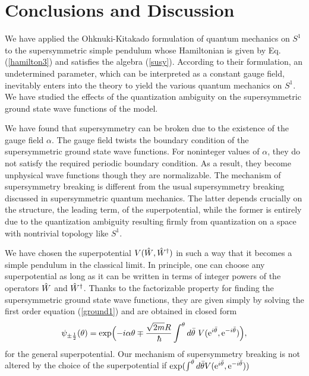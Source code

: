 \documentclass[a4paper,12pt]{article}
\begin{document}
{\section{Conclusions and Discussion}
We have applied the Ohknuki-Kitakado formulation of quantum 
mechanics on $S^1$ to the supersymmetric 
simple pendulum whose Hamiltonian is given by Eq. (\ref{hamilton3}) and 
satisfies the algebra (\ref{susy}). 
According to their formulation, an undetermined parameter, which can be 
interpreted as a constant gauge field, inevitably
enters into the theory to yield the various quantum mechanics on $S^1$.  
We have studied the effects of the quantization ambiguity on the 
supersymmetric ground state wave functions of the model.
\par
We have found that supersymmetry can be broken due to the 
existence of the gauge field $\alpha$. The gauge field twists 
the boundary condition
of the supersymmetric ground state wave functions. 
For noninteger values of $\alpha$, they 
do not satisfy the required periodic boundary condition.
As a result, they become unphysical wave functions though they are 
normalizable. The mechanism of supersymmetry breaking 
is different from the usual supersymmetry breaking
discussed in supersymmetric quantum mechanics. 
The latter depends crucially on the structure, the leading term, of 
the superpotential, while the former is entirely due to the quantization 
ambiguity resulting firmly from 
quantization on a space with nontrivial topology like $S^1$. 
\par
We have chosen the superpotential $V(\hat W,{\hat W}^{\dagger})$
in such a way that it becomes a simple pendulum in the classical limit.
In principle, one can choose any superpotential as long as it can be written 
in terms of integer powers of the operators $\hat W$ and ${\hat W}^{\dagger}$. 
Thanks to the factorizable property for finding  
the supersymmetric ground state wave functions,
they are given simply by solving the first order equation (\ref{ground1})
and are obtained in closed form
\begin{equation}
\psi_{\pm \half}({\theta})={\rm exp}\Bigl(-i\alpha\theta \mp 
{{\sqrt{2m}R}\over\hbar}\int^{\theta}d{\bar\theta}~V(\e^{i{\bar\theta}},
\e^{-i{\bar\theta}}) \Bigr),
\label{closed}
\end{equation} 
for the general superpotential.
Our mechanism of supersymmetry breaking is not altered by the 
choice of the superpotential
if ${\rm exp}(\int^{\theta}d{\bar\theta}
V({\rm e}^{i{\bar\theta}},{\rm e}^{-i{\bar\theta}}))$ 
}
\end{document}
